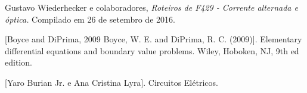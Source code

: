 \documentclass[11pt,a4paper]{article}
\begin{document}
\newpage
\begin{thebibliography}{10}

Gustavo Wiederhecker e colaboradores, \textsl{Roteiros de F429 - Corrente alternada e óptica.} Compilado em 26 de setembro de 2016.

[Boyce and DiPrima, 2009 Boyce, W. E. and DiPrima, R. C. (2009)]. Elementary differential equations and boundary value problems. Wiley, Hoboken, NJ, 9th ed edition.

[Yaro Burian Jr. e Ana Cristina Lyra]. Circuitos Elétricos.

\end{thebibliography}
\end{document}
